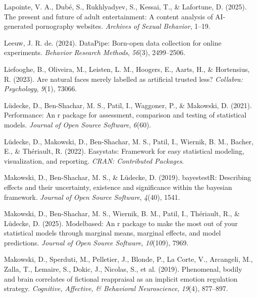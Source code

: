 \documentclass[
  jou,
  floatsintext,
  longtable,
  nolmodern,
  notxfonts,
  notimes,
  colorlinks=true,linkcolor=blue,citecolor=blue,urlcolor=blue]{apa7}
\newlength{\cslhangindent}
\newenvironment{CSLReferences}[2] %
 {\begin{list}{}{%
  \setlength{\itemindent}{0pt}
  \setlength{\leftmargin}{0pt}
  \setlength{\parsep}{0pt}
  \ifodd #1
   \setlength{\leftmargin}{\cslhangindent}
   \setlength{\itemindent}{-1\cslhangindent}
  \fi
  \setlength{\itemsep}{#2\baselineskip}}}
 {\end{list}}
\begin{document}
\begin{CSLReferences}{1}{0}
Lapointe, V. A., Dubé, S., Rukhlyadyev, S., Kessai, T., \& Lafortune, D.
(2025). The present and future of adult entertainment: A content
analysis of AI-generated pornography websites. \emph{Archives of Sexual
Behavior}, 1--19.

Leeuw, J. R. de. (2024). DataPipe: Born-open data collection for online
experiments. \emph{Behavior Research Methods}, \emph{56}(3), 2499--2506.

Liefooghe, B., Oliveira, M., Leisten, L. M., Hoogers, E., Aarts, H., \&
Hortensius, R. (2023). Are natural faces merely labelled as artificial
trusted less? \emph{Collabra: Psychology}, \emph{9}(1), 73066.

Lüdecke, D., Ben-Shachar, M. S., Patil, I., Waggoner, P., \& Makowski,
D. (2021). Performance: An r package for assessment, comparison and
testing of statistical models. \emph{Journal of Open Source Software},
\emph{6}(60).

Lüdecke, D., Makowski, D., Ben-Shachar, M. S., Patil, I., Wiernik, B.
M., Bacher, E., \& Thériault, R. (2022). Easystats: Framework for easy
statistical modeling, visualization, and reporting. \emph{CRAN:
Contributed Packages}.

Makowski, D., Ben-Shachar, M. S., \& Lüdecke, D. (2019). bayestestR:
Describing effects and their uncertainty, existence and significance
within the bayesian framework. \emph{Journal of Open Source Software},
\emph{4}(40), 1541.

Makowski, D., Ben-Shachar, M. S., Wiernik, B. M., Patil, I., Thériault,
R., \& Lüdecke, D. (2025). Modelbased: An r package to make the most out
of your statistical models through marginal means, marginal effects, and
model predictions. \emph{Journal of Open Source Software},
\emph{10}(109), 7969.

Makowski, D., Sperduti, M., Pelletier, J., Blonde, P., La Corte, V.,
Arcangeli, M., Zalla, T., Lemaire, S., Dokic, J., Nicolas, S., et al.
(2019). Phenomenal, bodily and brain correlates of fictional reappraisal
as an implicit emotion regulation strategy. \emph{Cognitive, Affective,
\& Behavioral Neuroscience}, \emph{19}(4), 877--897.


\end{CSLReferences}
\end{document}
